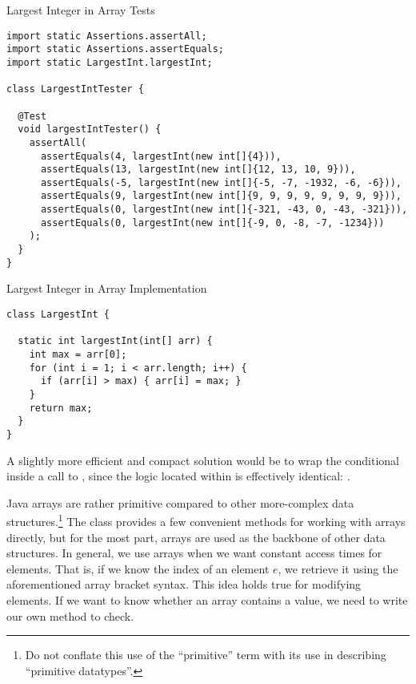 \begin{cl}{Largest Integer in Array Tests}
\begin{lstlisting}[language=MyJava]
import static Assertions.assertAll;
import static Assertions.assertEquals;
import static LargestInt.largestInt;

class LargestIntTester {

  @Test
  void largestIntTester() {
    assertAll(
      assertEquals(4, largestInt(new int[]{4})), 
      assertEquals(13, largestInt(new int[]{12, 13, 10, 9})), 
      assertEquals(-5, largestInt(new int[]{-5, -7, -1932, -6, -6})), 
      assertEquals(9, largestInt(new int[]{9, 9, 9, 9, 9, 9, 9, 9})), 
      assertEquals(0, largestInt(new int[]{-321, -43, 0, -43, -321})), 
      assertEquals(0, largestInt(new int[]{-9, 0, -8, -7, -1234})) 
    );
  }
}
\end{lstlisting}
\end{cl}

\begin{cl}{Largest Integer in Array Implementation}
\begin{lstlisting}[language=MyJava]
class LargestInt {

  static int largestInt(int[] arr) {
    int max = arr[0];
    for (int i = 1; i < arr.length; i++) {
      if (arr[i] > max) { arr[i] = max; }
    }
    return max;
  }
}
\end{lstlisting}
\end{cl}

A slightly more efficient and compact solution would be to wrap the conditional inside a call to , since the logic located within is effectively identical: .

Java arrays are rather primitive compared to other more-complex data structures.\footnote{Do not conflate this use of the ``primitive'' term with its use in describing ``primitive datatypes''.} The  class provides a few convenient methods for working with arrays directly, but for the most part, arrays are used as the backbone of other data structures. In general, we use arrays when we want constant access times for elements. That is, if we know the index of an element $e$, we retrieve it using the aforementioned array bracket syntax. This idea holds true for modifying elements. If we want to know whether an array contains a value, we need to write our own method to check. 

